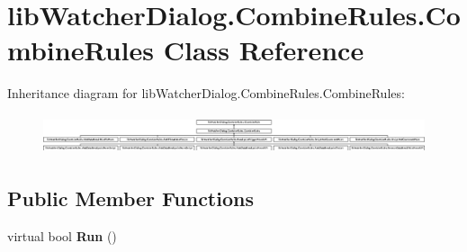 \hypertarget{classlib_watcher_dialog_1_1_combine_rules_1_1_combine_rules}{\section{lib\+Watcher\+Dialog.\+Combine\+Rules.\+Combine\+Rules Class Reference}
\label{classlib_watcher_dialog_1_1_combine_rules_1_1_combine_rules}
}
Inheritance diagram for lib\+Watcher\+Dialog.\+Combine\+Rules.\+Combine\+Rules\+:\begin{figure}[H]
\begin{center}
\leavevmode
\includegraphics[height=1.163636cm]{classlib_watcher_dialog_1_1_combine_rules_1_1_combine_rules}
\end{center}
\end{figure}
\subsection*{Public Member Functions}
\begin{DoxyCompactItemize}
\item 
\hypertarget{classlib_watcher_dialog_1_1_combine_rules_1_1_combine_rules_a40feaa5a7e42b63d32bc8b8470008ed3}{virtual bool {\bfseries Run} ()}\label{classlib_watcher_dialog_1_1_combine_rules_1_1_combine_rules_a40feaa5a7e42b63d32bc8b8470008ed3}

\end{DoxyCompactItemize}
